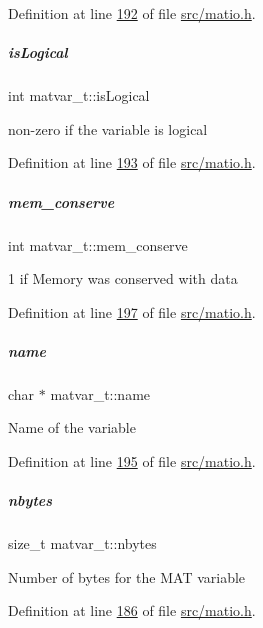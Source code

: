 Definition at line \hyperlink{src_2matio_8h_source_l00192}{192} of file \hyperlink{src_2matio_8h_source}{src/matio.\+h}.

\mbox{\label{group___m_a_t_a866c1539e68073a837833d74cd4a65be}} 
\subparagraph{\texorpdfstring{is\+Logical}{isLogical}}
{\footnotesize\ttfamily int matvar\+\_\+t\+::is\+Logical}

non-\/zero if the variable is logical 

Definition at line \hyperlink{src_2matio_8h_source_l00193}{193} of file \hyperlink{src_2matio_8h_source}{src/matio.\+h}.

\mbox{\label{group___m_a_t_aff20e87a00691c97340ab07656a13ee7}} 
\subparagraph{\texorpdfstring{mem\+\_\+conserve}{mem\_conserve}}
{\footnotesize\ttfamily int matvar\+\_\+t\+::mem\+\_\+conserve}

1 if Memory was conserved with data 

Definition at line \hyperlink{src_2matio_8h_source_l00197}{197} of file \hyperlink{src_2matio_8h_source}{src/matio.\+h}.

\mbox{\label{group___m_a_t_a5d4b55b041e3b4fb50c04337f05ad909}} 
\subparagraph{\texorpdfstring{name}{name}}
{\footnotesize\ttfamily char $\ast$ matvar\+\_\+t\+::name}

Name of the variable 

Definition at line \hyperlink{src_2matio_8h_source_l00195}{195} of file \hyperlink{src_2matio_8h_source}{src/matio.\+h}.

\mbox{\label{group___m_a_t_abf1c844540503be2df9bb3db93cfe307}} 
\subparagraph{\texorpdfstring{nbytes}{nbytes}}
{\footnotesize\ttfamily size\+\_\+t matvar\+\_\+t\+::nbytes}

Number of bytes for the M\+AT variable 

Definition at line \hyperlink{src_2matio_8h_source_l00186}{186} of file \hyperlink{src_2matio_8h_source}{src/matio.\+h}.

